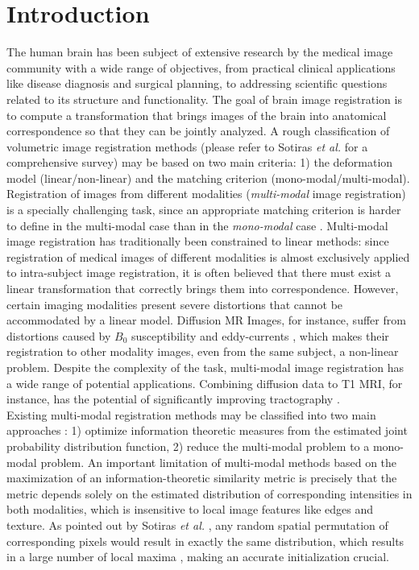 \section{Introduction}
The human brain has been subject of extensive research by the medical image community with a wide range of objectives, from practical clinical applications like disease diagnosis and surgical planning, to addressing scientific questions related to its structure and functionality. The goal of brain image registration is to compute a transformation that brings images of the brain into anatomical correspondence so that they can be jointly analyzed. A rough classification of volumetric image registration methods (please refer to Sotiras {\it et al.} \cite{Sotiras2013} for a comprehensive survey) may be based on two main criteria: 1) the deformation model (linear/non-linear) and the matching criterion (mono-modal/multi-modal). Registration of images from different modalities (\emph{multi-modal} image registration) is a specially challenging task, since an appropriate matching criterion is harder to define in the multi-modal case than in the \emph{mono-modal} case \cite{Sotiras2013}. Multi-modal image registration has traditionally been constrained to linear methods: since registration of medical images of different modalities is almost exclusively applied to intra-subject image registration, it is often believed that there must exist a linear transformation that correctly brings them into correspondence. However, certain imaging modalities present severe distortions that cannot be accommodated by a linear model. Diffusion MR Images, for instance, suffer from distortions caused by $B_{0}$ susceptibility and eddy-currents \cite{Tournier2011}\cite{Andersson2003}, which makes their registration to other modality images, even from the same subject, a non-linear problem. Despite the complexity of the task, multi-modal image registration has a wide range of potential applications. Combining diffusion data to T1 MRI, for instance, has the potential of significantly improving tractography \cite{Smith2012}.\\

Existing multi-modal registration methods may be classified into two main approaches \cite{Sotiras2013}: 1) optimize information theoretic measures from the estimated joint probability distribution function, 2) reduce the multi-modal problem to a mono-modal problem. An important limitation of multi-modal methods based on the maximization of an information-theoretic similarity metric is precisely that the metric depends solely on the estimated distribution of corresponding intensities in both modalities, which is insensitive to local image features like edges and texture. As pointed out by Sotiras {\it et al.} \cite{Sotiras2013}, any random spatial permutation of corresponding pixels would
result in exactly the same distribution, which results in a large number of local maxima \cite{Roche1998}, making an accurate initialization crucial.\\

